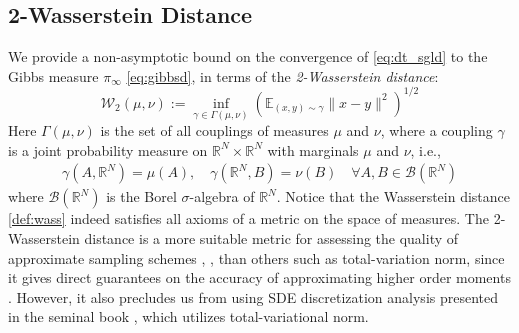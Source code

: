 \documentclass[journal,onecolumn]{IEEEtran}
\newcommand{\reals}{\mathbb{R}}
\newcommand{\CE}{\mathbb{E}}
\newcommand{\dimn}{N}
\newcommand{\wass}{\mathcal{W}_2}
\newcommand{\gibbs}{\ids_{\infty}}
\newcommand{\ids}{\pi}
\begin{document}
\subsection{2-Wasserstein Distance}
We provide a non-asymptotic bound on the convergence of \eqref{eq:dt_sgld} to the Gibbs measure $\gibbs$ \eqref{eq:gibbsd}, in terms of the \textit{2-Wasserstein distance}:
\begin{equation}
\label{def:wass}
\wass(\mu,\nu) := \inf_{\gamma \in \Gamma(\mu,\nu)} \left(\CE_{(x,y)\sim \gamma}\|x-y\|^2\right)^{1/2}
\end{equation}
Here $\Gamma(\mu,\nu)$ is the set of all couplings of measures $\mu$ and $\nu$, where a coupling $\gamma$ is a joint probability measure on $\reals^{\dimn} \times \reals^{\dimn}$ with marginals $\mu$ and $\nu$, i.e., 
\begin{align*}
\gamma(A,\reals^{\dimn}) = \mu(A) , \quad \gamma(\reals^{\dimn},B) = \nu(B) \quad \forall A,B \in \mathcal{B}(\reals^{\dimn})
\end{align*}
where $\mathcal{B}(\reals^{\dimn})$ is the Borel $\sigma$-algebra of $\reals^{\dimn}$. Notice that the Wasserstein distance \eqref{def:wass} indeed satisfies all axioms of a metric on the space of measures. The 2-Wasserstein distance is a more suitable metric for assessing the quality of approximate sampling schemes \cite{dalalyan2019user}, \cite{raginsky2017non}, than others such as total-variation norm, since it gives direct guarantees on the accuracy of approximating higher order moments \cite{dalalyan2019user}. However, it also precludes us from using SDE discretization analysis presented in the seminal book \cite{kloeden1992stochastic}, which utilizes total-variational norm.
\end{document}
